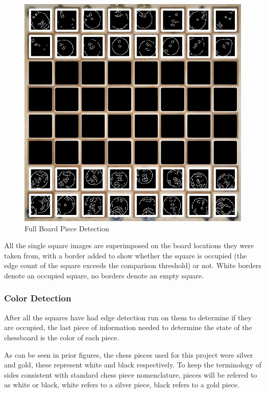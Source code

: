 \documentclass[journal]{IEEEtran}
\begin{document}
\begin{figure}[!ht]
	\centering
	\includegraphics[width=\linewidth]{Images/PieceDetection.jpg}
	\caption{Full Board Piece Detection}
	\label{piece detection}
\end{figure}

All the single square images are superimposed on the board locations they were taken from, with a border added to show whether the square is occupied (the edge count of the square exceeds the comparison threshold) or not. White borders denote an occupied square, no borders denote an empty square.

\vspace{12pt}

\subsubsection{Color Detection}
\label{ColorDetection}
After all the squares have had edge detection run on them to determine if they are occupied, the last piece of information needed to determine the state of the chessboard is the color of each piece.

As can be seen in prior figures, the chess pieces used for this project were silver and gold, these represent white and black respectively. To keep the terminology of sides consistent with standard chess piece nomenclature, pieces will be refered to as white or black, white refers to a silver piece, black refers to a gold piece.
\end{document}
